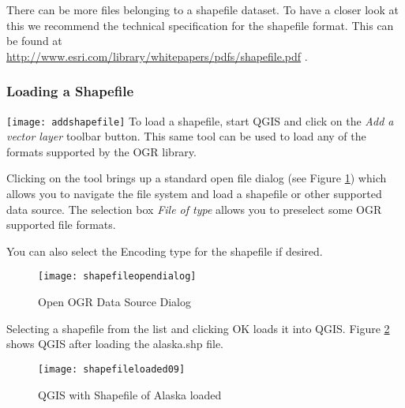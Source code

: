 There can be more files belonging to a shapefile dataset.
To have a closer look at this we recommend the technical specification for the shapefile format.
This can be found at\\
\url{http://www.esri.com/library/whitepapers/pdfs/shapefile.pdf}
.

\subsubsection{Loading a Shapefile}\label{sec:load_shapefile}
{\texttt{[image: addshapefile]}} To load a shapefile, start
QGIS and click on the \textit{Add a vector layer}
toolbar button. This same tool can be used to
load any of the formats supported by the OGR library.

Clicking on the tool brings up a standard open file dialog (see Figure
\ref{fig:openshapefile}) which allows you to navigate the file system and load
a shapefile or other supported data source. 
The selection box \textsl{File of type} allows you to preselect some OGR supported file formats.

You can also select the Encoding type for the shapefile if desired.

\begin{figure}[h]
   \begin{center}
   \caption{Open OGR Data Source Dialog}\label{fig:openshapefile}\smallskip
   \texttt{[image: shapefileopendialog]}
\end{center} 
\end{figure}

Selecting a shapefile from the list and clicking OK loads it into QGIS. Figure
\ref{fig:loadedshapefile} shows QGIS after loading the alaska.shp file.

\begin{figure}[ht]
   \begin{center}
   \caption{QGIS with Shapefile of Alaska loaded}\label{fig:loadedshapefile}\smallskip
   \texttt{[image: shapefileloaded09]}
\end{center} 
\end{figure}

\begin{Tip}\caption{\textsc{Layer Colors}}
\end{Tip}


